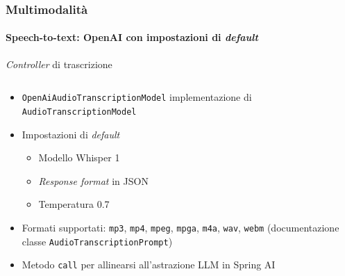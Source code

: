 \begin{frame}[t,fragile] \frametitle{Multimodalità}
    \framesubtitle{Speech-to-text: OpenAI con impostazioni di \textit{default}}
    \vspace*{-.7cm}
    {\footnotesize
        \begin{block}{\textit{Controller} di trascrizione}
			{\tiny\inputminted{java}{code/AudioController.java}}
    	\end{block}
        \vspace*{.1cm}
        \begin{itemize}[leftmargin=10pt,align=right]
            \item[\alert{\faArrowCircleRight}] \alert{\texttt{OpenAiAudioTranscriptionModel}} implementazione di \alert{\texttt{AudioTranscriptionModel}}
            \item[\alert{\faArrowCircleRight}] Impostazioni di \textit{default}
            \begin{itemize}[leftmargin=10pt,align=right]
                \item[\alert{\faArrowCircleRight}] Modello Whisper 1
                \item[\alert{\faArrowCircleRight}] \textit{Response format} in JSON
                \item[\alert{\faArrowCircleRight}] Temperatura 0.7
            \end{itemize}
            \item[\alert{\faArrowCircleRight}] Formati supportati: \texttt{mp3}, \texttt{mp4}, \texttt{mpeg}, \texttt{mpga}, \texttt{m4a}, \texttt{wav}, \texttt{webm} (documentazione classe \alert{\texttt{AudioTranscriptionPrompt}})
            \item[\alert{\faExclamationTriangle}] Metodo \alert{\texttt{call}} per allinearsi all'astrazione LLM in Spring AI       \end{itemize}       
    }
\end{frame}    
%
